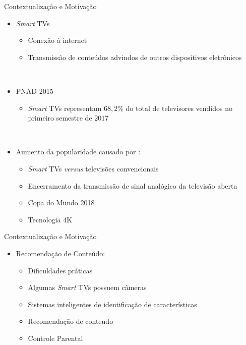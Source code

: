 \begin{frame}{Contextualização e Motivação}

    \begin{itemize}
      \item \alert{\emph{Smart} TVs}
      \begin{itemize}
          \item Conexão à internet
          \item Transmissão de conteúdos advindos de outros dispositivos eletrônicos
      \end{itemize}
      \ \ \newline
      \item PNAD 2015
      \begin{itemize}
        \item \emph{Smart} TVs representam $68,2\%$ do total de televisores vendidos no primeiro semestre de $2017$
      \end{itemize}
      \ \ \newline
      \item Aumento da popularidade causado por :
      \begin{itemize}
        \item \emph{Smart} TVs \emph{versus} televisões convencionais
        \item Encerramento da transmissão de sinal analógico da televisão aberta
        \item Copa do Mundo 2018
        \item Tecnologia 4K
      \end{itemize}

    \end{itemize}
\end{frame}

\begin{frame}{Contextualização e Motivação}
   \ \  \\[0.1cm]
  \begin{itemize}
  \item \alert{Recomendação de Conteúdo}:
  \begin{itemize}
    \item Dificuldades práticas
    \item Algumas \emph{Smart} TVs possuem câmeras
    \item Sistemas inteligentes de identificação de características
    \item Recomendação de conteudo
    \item Controle Parental
  \end{itemize}
  \end{itemize}

\end{frame}

